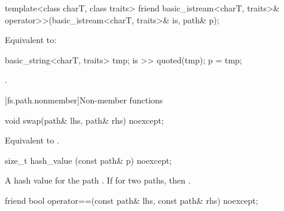 %
\begin{itemdecl}
template<class charT, class traits>
  friend basic_istream<charT, traits>&
    operator>>(basic_istream<charT, traits>& is, path& p);
\end{itemdecl}

\begin{itemdescr}
\pnum
\effects
Equivalent to:
\begin{codeblock}
basic_string<charT, traits> tmp;
is >> quoted(tmp);
p = tmp;
\end{codeblock}

\pnum
\returns {}.
\end{itemdescr}

[fs.path.nonmember]{Non-member functions}

%
\begin{itemdecl}
void swap(path& lhs, path& rhs) noexcept;
\end{itemdecl}

\begin{itemdescr}
\pnum
\effects Equivalent to .
\end{itemdescr}

%
\begin{itemdecl}
size_t hash_value (const path& p) noexcept;
\end{itemdecl}

\begin{itemdescr}
\pnum
\returns A hash value for the path . If
  for two paths,  then .
\end{itemdescr}

%
\begin{itemdecl}
friend bool operator==(const path& lhs, const path& rhs) noexcept;
\end{itemdecl}

